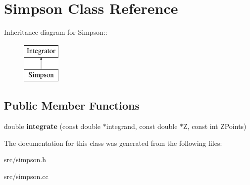 \hypertarget{classSimpson}{
\section{Simpson Class Reference}
\label{d7/d99/classSimpson}
}
Inheritance diagram for Simpson::\begin{figure}[H]
\begin{center}
\leavevmode
\includegraphics[height=2cm]{d7/d99/classSimpson}
\end{center}
\end{figure}
\subsection*{Public Member Functions}
\begin{DoxyCompactItemize}
\item 
\hypertarget{classSimpson_ab90da2fb197efe2f4a669bf5029a16f4}{
double {\bfseries integrate} (const double $\ast$integrand, const double $\ast$Z, const int ZPoints)}
\label{d7/d99/classSimpson_ab90da2fb197efe2f4a669bf5029a16f4}

\end{DoxyCompactItemize}


The documentation for this class was generated from the following files:\begin{DoxyCompactItemize}
\item 
src/simpson.h\item 
src/simpson.cc\end{DoxyCompactItemize}
